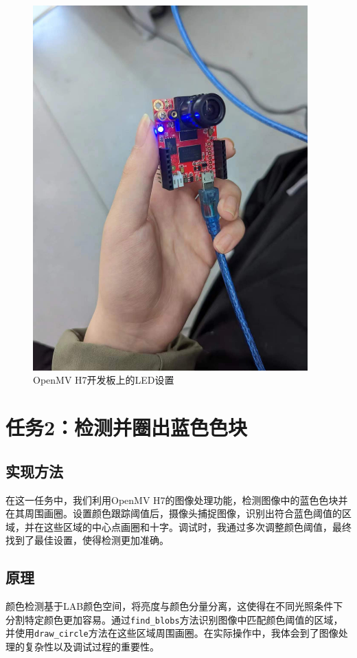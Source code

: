\documentclass{article}
\begin{document}
\begin{figure}[H]
    \centering
    \includegraphics[width=300pt]{./LED.jpg}
    \caption{OpenMV H7开发板上的LED设置}
\end{figure}

\section{任务2：检测并圈出蓝色色块}
\subsection{实现方法}
在这一任务中，我们利用OpenMV H7的图像处理功能，检测图像中的蓝色色块并在其周围画圈。设置颜色跟踪阈值后，摄像头捕捉图像，识别出符合蓝色阈值的区域，并在这些区域的中心点画圈和十字。调试时，我通过多次调整颜色阈值，最终找到了最佳设置，使得检测更加准确。

\subsection{原理}
颜色检测基于LAB颜色空间，将亮度与颜色分量分离，这使得在不同光照条件下分割特定颜色更加容易。通过\texttt{find\_blobs}方法识别图像中匹配颜色阈值的区域，并使用\texttt{draw\_circle}方法在这些区域周围画圈。在实际操作中，我体会到了图像处理的复杂性以及调试过程的重要性。
\end{document}
